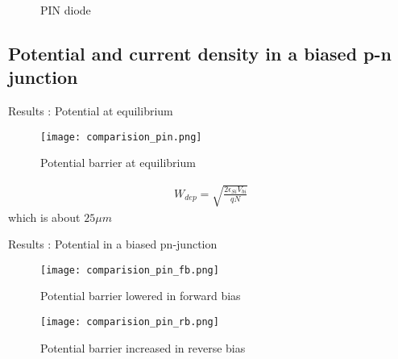 \documentclass{beamer}
\begin{document}
\begin{frame}
\begin{figure}[h!]
\centering
{}
\caption{PIN diode}
\label{fig:PIN}
\end{figure}
\end{frame}

\subsection{Potential and current density in a biased p-n junction}

\begin{frame}{Results : Potential at equilibrium}
\begin{figure}[h!]
     \centering
        \texttt{[image: comparision\_pin.png]}
         \caption{Potential barrier at equilibrium}
         \label{fig:pot_eq}
     \end{figure}
\begin{align*}
W_{dep} = \sqrt{\frac{2\epsilon_{Si} V_{bi}}{q N}} 
\end{align*}
which is about $25 \mu m$      
\end{frame}

\begin{frame}{Results : Potential in a biased pn-junction}
\begin{figure}[h!]
     \centering
        \texttt{[image: comparision\_pin\_fb.png]}
         \caption{Potential barrier lowered in forward bias}
         \label{fig:pot_fb}
     \end{figure}
\end{frame}
     
\begin{frame}   
\begin{figure}[h!]
     \centering
        \texttt{[image: comparision\_pin\_rb.png]}
         \caption{Potential barrier increased in reverse bias}
         \label{fig:pot_rb}
     \end{figure}     

\end{frame}
\end{document}

